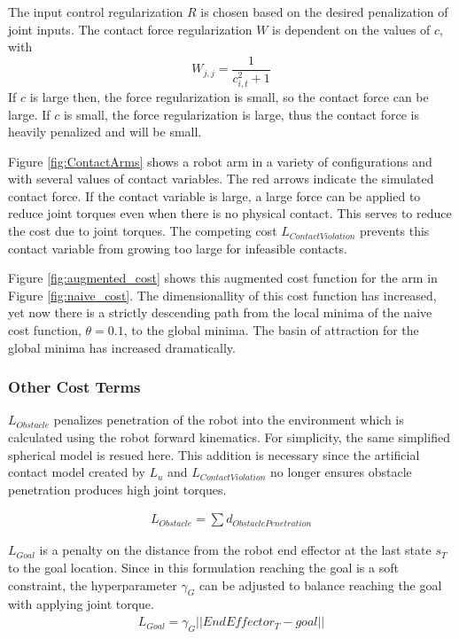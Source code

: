 \documentclass[../thesis.tex]{subfiles}
\begin{document}
The input control regularization $R$ is chosen based on the desired penalization of joint inputs. The contact force regularization $W$ is dependent on the values of $c$, with 
$$W_{j,j} = \frac{1}{c_{i,t}^2 + 1}$$
If $c$ is large then, the force regularization is small, so the contact force can be large.
If $c$ is small, the force regularization is large, thus the contact force is heavily penalized and will be small.

Figure \ref{fig:ContactArms} shows a robot arm in a variety of configurations and with several values of contact variables.
The red arrows indicate the simulated contact force.
If the contact variable is large, a large force can be applied to reduce joint torques even when there is no physical contact.
This serves to reduce the cost due to joint torques.
The competing cost $L_{Contact Violation}$ prevents this contact variable from growing too large for infeasible contacts.


Figure \ref{fig:augmented_cost} shows this augmented cost function for the arm in Figure \ref{fig:naive_cost}.
The dimensionallity of this cost function has increased, yet now there is a strictly descending path from the local minima of the naive cost function, $\theta=0.1$, to the global minima.
The basin of attraction for the global minima has increased dramatically.




\subsubsection{Other Cost Terms}
$L_{Obstacle}$ penalizes penetration of the robot into the environment which is calculated using the robot forward kinematics.
For simplicity, the same simplified spherical model is resued here.
This addition is necessary since the artificial contact model created by $L_u$ and $L_{ContactViolation}$ no longer ensures obstacle penetration produces high joint torques.

\begin{align}
  L_{Obstacle} = \sum d_{ObstaclePenetration}
\end{align}

$L_{Goal}$ is a penalty on the distance from the robot end effector at the last state $s_T$ to the goal location.
Since in this formulation reaching the goal is a soft constraint, the hyperparameter $\gamma_G$ can be adjusted to balance reaching the goal with applying joint torque.
\begin{align}
  L_{Goal} = \gamma_G ||EndEffector_T - goal||
\end{align}
\end{document}
